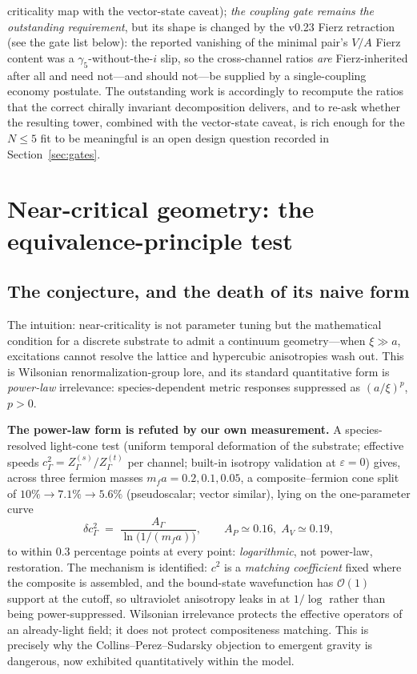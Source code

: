 \documentclass[11pt,a4paper]{article}
\begin{document}
criticality map with the vector-state caveat); \emph{the coupling
gate remains the outstanding requirement}, but its shape is
changed by the v0.23 Fierz retraction (see the gate list below):
the reported vanishing of the minimal pair's $V/A$ Fierz content
was a $\gamma_5$-without-the-$i$ slip, so the cross-channel ratios
\emph{are} Fierz-inherited after all and need not---and should
not---be supplied by a single-coupling economy postulate.  The
outstanding work is accordingly to recompute the ratios that the
correct chirally invariant decomposition delivers, and to re-ask
whether the resulting tower, combined with the vector-state
caveat, is rich enough for the $N \le 5$
fit to be meaningful is an open design question recorded in
Section~\ref{sec:gates}.


\section{Near-critical geometry: the equivalence-principle test}
\label{sec:epgeom}

\subsection{The conjecture, and the death of its naive form}

The intuition: near-criticality is not parameter tuning but the
mathematical condition for a discrete substrate to admit a
continuum geometry---when $\xi \gg a$, excitations cannot resolve
the lattice and hypercubic anisotropies wash out.
This is Wilsonian renormalization-group lore, and its standard
quantitative form is \emph{power-law} irrelevance:
species-dependent metric responses suppressed as $(a/\xi)^p$,
$p > 0$.

\textbf{The power-law form is refuted by our own measurement.}
A species-resolved light-cone test (uniform temporal deformation
of the substrate; effective speeds $c_\Gamma^2 = Z^{(s)}_\Gamma /
Z^{(t)}_\Gamma$ per channel; built-in isotropy validation at
$\varepsilon = 0$) gives, across three fermion masses
$m_f a = 0.2, 0.1, 0.05$, a composite--fermion cone split of
$10\% \to 7.1\% \to 5.6\%$ (pseudoscalar; vector similar), lying
on the one-parameter curve
\begin{equation}
\delta c^2_\Gamma \;=\; \frac{A_\Gamma}{\ln\!\bigl(1/(m_f a)\bigr)},
\qquad A_P \simeq 0.16,\; A_V \simeq 0.19,
\label{eq:loglaw}
\end{equation}
to within $0.3$ percentage points at every point:
\emph{logarithmic}, not power-law, restoration.
The mechanism is identified: $c^2$ is a \emph{matching
coefficient} fixed where the composite is assembled, and the
bound-state wavefunction has $\mathcal{O}(1)$ support at the
cutoff, so ultraviolet anisotropy leaks in at $1/\log$ rather
than being power-suppressed.  Wilsonian irrelevance protects the
effective operators of an already-light field; it does not
protect compositeness matching.  This is precisely why the
Collins--Perez--Sudarsky objection to emergent gravity is
dangerous, now exhibited quantitatively within the model.
\end{document}
